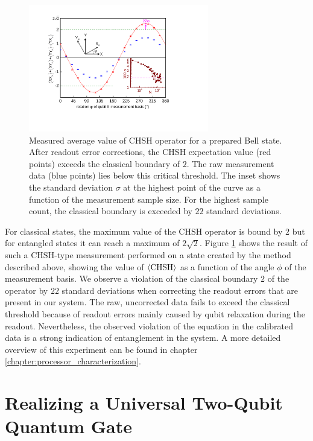 %
\begin{figure}[ht!]
 \centering \includegraphics[width=0.7\textwidth]{./material/papers/iswap/submission1/Dewes_Figure3}
\caption[Measurement of the CHSH operator of an entanged two-qubit state]{Measured average value of CHSH operator for a prepared
Bell state. After readout error corrections, the CHSH expectation
value (red points) exceeds the classical boundary of $2$. The raw
measurement data (blue points) lies below this critical threshold.
The inset shows the standard deviation $\sigma$ at the highest point
of the curve as a function of the measurement sample size. For the
highest sample count, the classical boundary is exceeded by $22$
standard deviations.}


\label{fig:chsh_measurement} %
\end{figure}


For classical states, the maximum value of the $\mathrm{CHSH}$ operator
is bound by $2$ but for entangled states it can reach a maximum of
$2\sqrt{2}$. Figure \ref{fig:chsh_measurement}
shows the result of such a $\mathrm{CHSH}$-type measurement performed
on a state created by the method described above, showing the value
of $\left< \mathrm{CHSH} \right>$ as a function of the angle $\phi$ of
the measurement basis. We observe a violation of the classical boundary $2$
of the operator by $22$ standard deviations when correcting the readout
errors that are present in our system. The raw, uncorrected data fails
to exceed the classical threshold because of readout errors mainly
caused by qubit relaxation during the readout. Nevertheless, the observed
violation of the equation in the calibrated data is a strong indication
of entanglement in the system. A more detailed overview of this experiment can be found in chapter \ref{chapter:processor_characterization}.


\section{Realizing a Universal Two-Qubit Quantum Gate}

